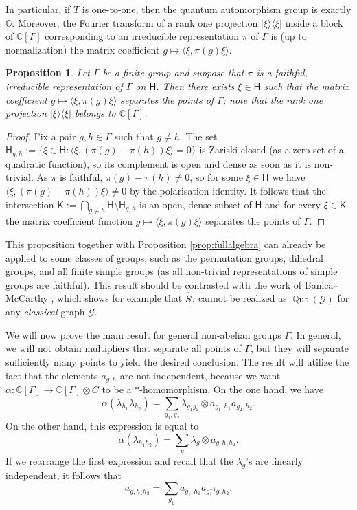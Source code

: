 \documentclass[12pt]{amsart}
\newtheorem{prop}[thm]{Proposition}
\theoremstyle{definition}
\theoremstyle{definition}
\theoremstyle{definition}
\theoremstyle{definition}
\DeclareMathOperator{\Qut}{\mathbb{Q}ut}
\newcommand{\G}{\mathbb{G}}
\newcommand{\C}{\mathbb{C}}
\newcommand{\HH}{\mathsf{H}}
\newcommand{\K}{\mathsf{K}}
\newcommand{\Gr}{\mathcal{G}}
\numberwithin{equation}{section}
\begin{document}
In particular, if $T$ is one-to-one, then the quantum automorphism group is exactly $\G$. Moreover, the Fourier transform of a rank one projection $|\xi\rangle\langle \xi|$ inside a block of $\mathbb{C}[\Gamma]$ corresponding to an irreducible representation $\pi$ of $\Gamma$ is (up to normalization) the matrix coefficient $g \mapsto \langle \xi, \pi(g) \xi\rangle$. 

\begin{prop}\label{prop:faithfulirrep}
Let $\Gamma$ be a finite group and suppose that $\pi$ is a faithful, irreducible representation of $\Gamma$ on $\HH$. Then there exists $\xi \in \HH$  such that the matrix coefficient $g\mapsto \langle \xi, \pi(g) \xi\rangle$ separates the points of $\Gamma$; note that  the rank one projection $|\xi\rangle\langle \xi|$ belongs to $\C[\Gamma]$.
\end{prop}
\begin{proof}
Fix a pair $g,h \in \Gamma$ such that $g\neq h$. The set $\HH_{g,h}:=\{\xi \in \HH: \langle \xi, (\pi(g) - \pi(h)) \xi\rangle =0\}$ is Zariski closed (as a zero set of a quadratic function), so its complement is open and dense as soon as it is non-trivial. As $\pi$ is faithful, $\pi(g) - \pi(h)\neq 0$, so for some $\xi \in \HH$ we have $\langle \xi, (\pi(g) - \pi(h))\xi\rangle \neq 0$ by the polarisation identity. It follows that the intersection $\K:=\bigcap_{g\neq h} \HH \setminus \HH_{g,h}$ is an open, dense subset of $\HH$ and for every $\xi \in \K$ the matrix coefficient function $ g \mapsto \langle \xi, \pi(g) \xi\rangle$ separates the points of $\Gamma$.
\end{proof}
This proposition together with Proposition \ref{prop:fullalgebra} can already be applied to some classes of groups, such as the permutation groups, dihedral groups, and all finite simple groups (as all non-trivial representations of simple groups are faithful).  This result should be contrasted with the work of Banica--McCarthy \cite{BM22}, which shows for example that $\widehat S_3$ cannot be realized as $\Qut(\Gr)$ for any {\it classical} graph $\Gr$.   

We will now prove the main result for general non-abelian groups $\Gamma$. In general, we will not obtain multipliers that separate all points of $\Gamma$, but they will separate sufficiently many points to yield the desired conclusion. The result will utilize the fact that the elements $a_{g,h}$ are not independent, because we want $\alpha: \C[\Gamma] \to \C[\Gamma] \otimes C$ to be a $\ast$-homomorphism. On the one hand, we have
\[
\alpha(\lambda_{h_1} \lambda_{h_2}) = \sum_{g_1, g_2} \lambda_{g_1 g_2} \otimes a_{g_1, h_1} a_{g_2, h_2}.
\]
On the other hand, this expression is equal to 
\[
\alpha(\lambda_{h_1 h_2}) = \sum_{g} \lambda_g \otimes a_{g, h_1 h_2}.
\]
If we rearrange the first expression and recall that the $\lambda_g$'s are linearly independent, it follows that
\[
a_{g, h_1 h_2} = \sum_{g_1} a_{g_1, h_1} a_{g_1^{-1}g, h_2}.
\]
\end{document}
